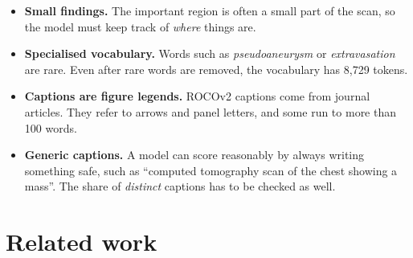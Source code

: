 \begin{itemize}
\tightlist
\item
  \textbf{Small findings.} The important region is often a small part of the scan, so the model must keep track of \emph{where} things are.
\item
  \textbf{Specialised vocabulary.} Words such as \emph{pseudoaneurysm} or \emph{extravasation} are rare. Even after rare words are removed, the vocabulary has 8,729 tokens.
\item
  \textbf{Captions are figure legends.} ROCOv2 captions come from journal articles. They refer to arrows and panel letters, and some run to more than 100 words.
\item
  \textbf{Generic captions.} A model can score reasonably by always writing something safe, such as ``computed tomography scan of the chest showing a mass''. The share of \emph{distinct} captions has to be checked as well.
\end{itemize}


\section{Related work}

